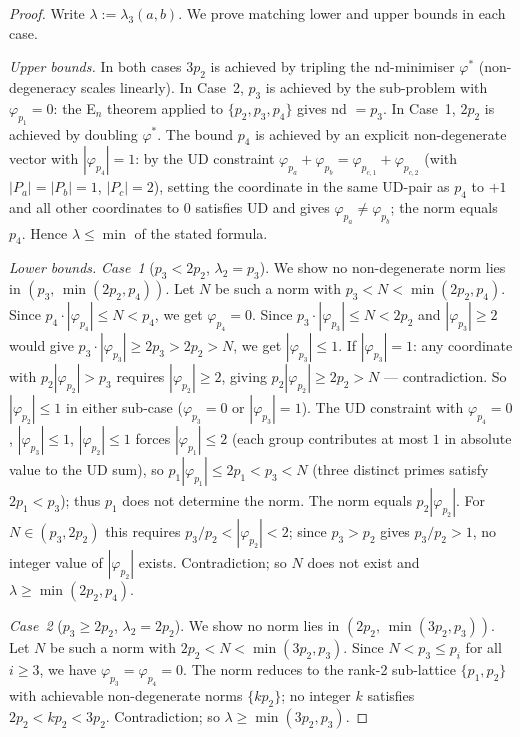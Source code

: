 \documentclass[12pt]{article}
\theoremstyle{definition}
\begin{document}
\begin{proof}
  Write $\lambda := \lambda_3(a,b)$.  We prove matching lower and upper bounds in each case.

  \textit{Upper bounds.}
  In both cases $3p_2$ is achieved by tripling the nd-minimiser $\varphi^*$
  (non-degeneracy scales linearly).
  In Case~2, $p_3$ is achieved by the sub-problem with $\varphi_{p_1}=0$:
  the E$_n$ theorem applied to $\{p_2,p_3,p_4\}$ gives nd $= p_3$.
  In Case~1, $2p_2$ is achieved by doubling $\varphi^*$.
  The bound $p_4$ is achieved by an explicit non-degenerate vector with
  $|\varphi_{p_4}|=1$: by the UD constraint $\varphi_{p_a}+\varphi_{p_b}=
  \varphi_{p_{c,1}}+\varphi_{p_{c,2}}$ (with $|P_a|=|P_b|=1$, $|P_c|=2$),
  setting the coordinate in the same UD-pair as $p_4$ to $+1$ and all other
  coordinates to $0$ satisfies UD and gives $\varphi_{p_a}\ne\varphi_{p_b}$;
  the norm equals $p_4$.
  Hence $\lambda \le \min$ of the stated formula.

  \textit{Lower bounds.}
  \textit{Case~1} ($p_3 < 2p_2$, $\lambda_2 = p_3$).
  We show no non-degenerate norm lies in $(p_3,\, \min(2p_2, p_4))$.
  Let $N$ be such a norm with $p_3 < N < \min(2p_2, p_4)$.
  Since $p_4 \cdot |\varphi_{p_4}| \le N < p_4$, we get $\varphi_{p_4} = 0$.
  Since $p_3 \cdot |\varphi_{p_3}| \le N < 2p_2$ and $|\varphi_{p_3}| \ge 2$
  would give $p_3 \cdot |\varphi_{p_3}| \ge 2p_3 > 2p_2 > N$, we get
  $|\varphi_{p_3}| \le 1$.  If $|\varphi_{p_3}|=1$: any coordinate with
  $p_2|\varphi_{p_2}| > p_3$ requires $|\varphi_{p_2}|\ge 2$,
  giving $p_2|\varphi_{p_2}|\ge 2p_2 > N$ --- contradiction.
  So $|\varphi_{p_2}|\le 1$ in either sub-case ($\varphi_{p_3}=0$ or $|\varphi_{p_3}|=1$).
  The UD constraint with $\varphi_{p_4}=0$, $|\varphi_{p_3}|\le 1$, $|\varphi_{p_2}|\le 1$
  forces $|\varphi_{p_1}|\le 2$ (each group contributes at most $1$ in absolute value
  to the UD sum), so $p_1|\varphi_{p_1}|\le 2p_1 < p_3 < N$
  (three distinct primes satisfy $2p_1 < p_3$); thus $p_1$ does not determine the norm.
  The norm equals $p_2|\varphi_{p_2}|$.  For $N \in (p_3, 2p_2)$ this requires
  $p_3/p_2 < |\varphi_{p_2}| < 2$; since $p_3 > p_2$ gives $p_3/p_2 > 1$, no
  integer value of $|\varphi_{p_2}|$ exists.
  Contradiction; so $N$ does not exist and $\lambda \ge \min(2p_2, p_4)$.

  \textit{Case~2} ($p_3 \ge 2p_2$, $\lambda_2 = 2p_2$).
  We show no norm lies in $(2p_2,\, \min(3p_2, p_3))$.
  Let $N$ be such a norm with $2p_2 < N < \min(3p_2, p_3)$.
  Since $N < p_3 \le p_i$ for all $i \ge 3$, we have $\varphi_{p_3}=\varphi_{p_4}=0$.
  The norm reduces to the rank-2 sub-lattice $\{p_1,p_2\}$ with achievable
  non-degenerate norms $\{k p_2\}$; no integer $k$ satisfies $2p_2 < k p_2 < 3p_2$.
  Contradiction; so $\lambda \ge \min(3p_2, p_3)$.
\end{proof}
\end{document}
